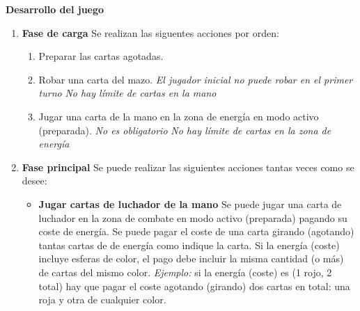 \documentclass[10pt,a4paper]{article}
\begin{document}
\begin{shaded}
  \textbf{Desarrollo del juego}
  \begin{enumerate}
    \item \textbf{Fase de carga} \newline
    Se realizan las siguentes acciones por orden:
    \begin{enumerate}
      \item Preparar las cartas agotadas.
      \item Robar una carta del mazo. \newline
            \emph{El jugador inicial no puede robar en el primer turno} \newline
            \emph{No hay límite de cartas en la mano}
      \item Jugar una carta de la mano en la zona de energía en modo activo (preparada). \newline
            \emph{No es obligatorio} \newline
            \emph{No hay límite de cartas en la zona de energía}
    \end{enumerate}

    \item \textbf{Fase principal} \newline
    Se puede realizar las siguientes acciones tantas veces como se desee:
    \begin{itemize}
      \item \textbf{Jugar cartas de luchador de la mano} \newline
      Se puede jugar una carta de luchador en la zona de combate en modo activo (preparada) pagando su coste de energía.
      Se puede pagar el coste de una carta girando (agotando) tantas cartas de de energía como indique la carta.
      Si la energía (coste) incluye esferas de color, el pago debe incluir la misma cantidad (o más) de cartas del mismo color. \newline
      \emph{Ejemplo:} si la energía (coste) es (1 rojo, 2 total) hay que pagar el coste agotando (girando) dos cartas en total: una roja y otra de cualquier color.


\end{itemize}
\end{enumerate}
\end{shaded}
\end{document}
